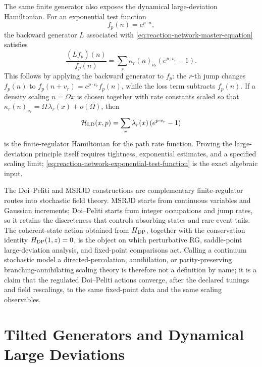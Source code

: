 The same finite generator also exposes the dynamical large-deviation
Hamiltonian.  For an exponential test function
\[
  f_p(n)=e^{p\cdot n},
\]
the backward generator \(L\) associated with
\eqref{eq:reaction-network-master-equation} satisfies
\begin{equation}
  \frac{(Lf_p)(n)}{f_p(n)}
  =
  \sum_r
  \kappa_r(n)_{\nu_r}
  \left(e^{p\cdot v_r}-1\right).
  \label{eq:reaction-network-exponential-test-function}
\end{equation}
This follows by applying the backward generator to \(f_p\):
the \(r\)-th jump changes \(f_p(n)\) to
\(f_p(n+v_r)=e^{p\cdot v_r}f_p(n)\), while the loss term subtracts
\(f_p(n)\).
If a density scaling \(n=\Omega x\) is chosen together with rate constants
scaled so that \(\kappa_r(n)_{\nu_r}=\Omega\,\lambda_r(x)+o(\Omega)\), then
\[
  \mathcal H_{\rm LD}(x,p)
  =
  \sum_r
  \lambda_r(x)
  \left(e^{p\cdot v_r}-1\right)
\]
is the finite-regulator Hamiltonian for the path rate function.  Proving the
large-deviation principle itself requires tightness, exponential estimates,
and a specified scaling limit;
\eqref{eq:reaction-network-exponential-test-function} is the exact algebraic
input.

The Doi--Peliti and MSRJD constructions are complementary finite-regulator
routes into stochastic field theory.  MSRJD starts from continuous variables
and Gaussian increments; Doi--Peliti starts from integer occupations and
jump rates, so it retains the discreteness that controls absorbing states and
rare-event tails.  The coherent-state action obtained from
\(H_{\rm DP}\), together with the conservation identity \(H_{\rm DP}(1,z)=0\),
is the object on which perturbative RG, saddle-point large-deviation
analysis, and fixed-point comparisons act.  Calling a continuum stochastic
model a directed-percolation, annihilation, or parity-preserving
branching-annihilating scaling theory is therefore not a definition by name;
it is a claim that the regulated Doi--Peliti actions converge, after the
declared tunings and field rescalings, to the same fixed-point data and the
same scaling observables.

\section{Tilted Generators and Dynamical Large Deviations}
\label{sec:finite-tilted-generators-large-deviations}

